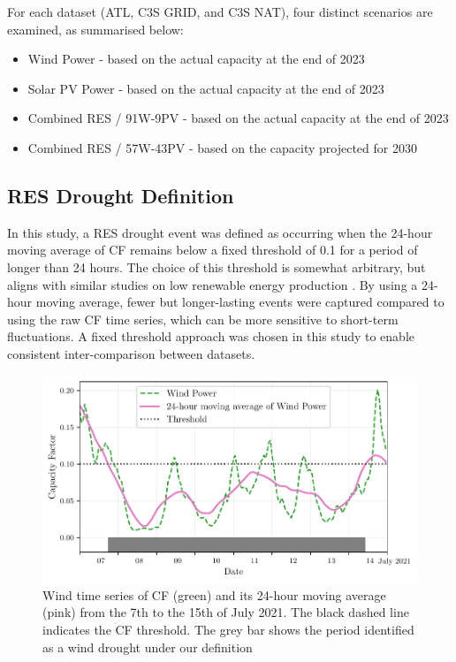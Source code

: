 \documentclass[preprint, 12pt]{elsarticle}
\begin{document}
For each dataset (ATL, C3S GRID, and C3S NAT), four distinct scenarios are examined, as summarised below:

\begin{itemize}
	\item Wind Power - based on the actual capacity at the end of 2023
	\item Solar PV Power - based on the actual capacity at the end of 2023
	\item Combined RES / 91W-9PV - based on the actual capacity at the end of 2023
	\item Combined RES / 57W-43PV - based on the capacity projected for 2030
\end{itemize}

\subsection{RES Drought Definition}
\label{sec:res_drought}

In this study, a RES drought event was defined as occurring when the 24-hour moving average of CF remains below a fixed threshold of 0.1 for a period of longer than 24 hours. The choice of this threshold is somewhat arbitrary, but aligns with similar studies on low renewable energy production \citep{kaspar2019drought, ohba2022drought, mayer2023drought}. By using a 24-hour moving average, fewer but longer-lasting events were captured compared to using the raw CF time series, which can be more sensitive to short-term fluctuations. A fixed threshold approach was chosen in this study to enable consistent inter-comparison between datasets.

\begin{figure}[ht!]
	\centering
	\includegraphics[width=\textwidth]{droughts_methodology.pdf}
	\caption{Wind time series of CF (green) and its 24-hour moving average (pink) from the 7th to the 15th of July 2021. The black dashed line indicates the CF threshold. The grey bar shows the period identified as a wind drought under our definition}
	\label{fig:find_res_droughts}
\end{figure}
\end{document}
